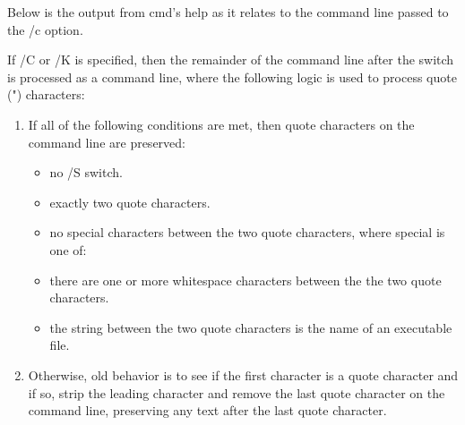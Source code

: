 {Below is the output from cmd's help as it relates to the command line
passed to the /c option.

If /C or /K is specified, then the remainder of the command line after
the switch is processed as a command line, where the following logic is
used to process quote (") characters:

\begin{enumerate}
\item
If all of the following conditions are met, then quote characters
on the command line are preserved:
\begin{itemize}
\item no /S switch.
\item exactly two quote characters.
\item no special characters between the two quote characters,
where special is one of: \configCharsToQuote
\item there are one or more whitespace characters between the
the two quote characters.
\item the string between the two quote characters is the name
of an executable file.
\end{itemize}

\item  Otherwise, old behavior is to see if the first character is
a quote character and if so, strip the leading character and
remove the last quote character on the command line, preserving
any text after the last quote character.
\end{enumerate}

%
%
%
%
%
%
%
%
}

